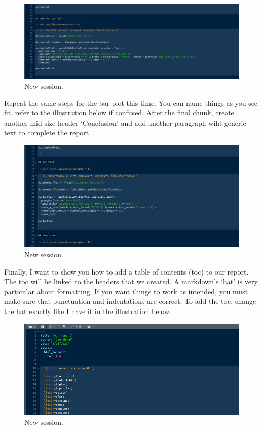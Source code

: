 \documentclass[]{book}
\begin{document}
\begin{figure}
\centering
\includegraphics{markdown8.png}
\caption{New session.}
\end{figure}

Repeat the same steps for the bar plot this time. You can name things as you see fit. refer to the illustration below if confused. After the final chunk, create another mid-size header `Conclusion' and add another paragraph wiht generic text to complete the report.

\begin{figure}
\centering
\includegraphics{markdown9.png}
\caption{New session.}
\end{figure}

Finally, I want to show you how to add a table of contents (toc) to our report. The toc will be linked to the headers that we created. A markdown's `hat' is very particular about formatting. If you want things to work as intended, you must make sure that punctuation and indentations are correct. To add the toc, change the hat exactly like I have it in the illustration below.

\begin{figure}
\centering
\includegraphics{markdown10.png}
\caption{New session.}
\end{figure}
\end{document}
